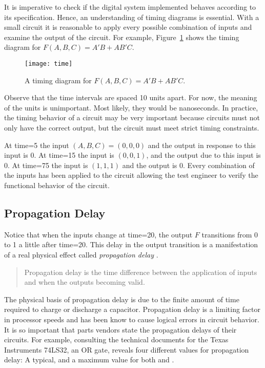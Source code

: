 It is imperative to check if the digital system implemented
behaves according to its specification. Hence, an understanding of
timing diagrams is essential.  With a small circuit it is reasonable
to apply every possible combination of inputs and examine the 
output of the circuit.  For example, Figure~\ref{fig:represenationsTime} shows
the timing diagram for $F(A,B,C) = A'B+AB'C$.

\begin{figure}[ht]
\texttt{[image: time]}
\caption{A timing diagram for $F(A,B,C) = A'B + AB'C$.}
\label{fig:represenationsTime}
\end{figure}

Observe that the time intervals are spaced 10 units apart.  For
now, the meaning of the units is unimportant.  Most likely, they would
be nanoseconds.  In practice, the timing behavior of a circuit
may be very important because circuits must not only have the 
correct output, but the circuit must meet strict timing constraints.

At time=5 the input $(A,B,C)=(0,0,0)$ and the output in response
to this input is 0.  At time=15 the input is $(0,0,1)$, and the
output due to this input is 0.  At time=75 the input is $(1,1,1)$
and the output is 0.  Every combination of the inputs has been 
applied to the circuit allowing the test engineer to verify the 
functional behavior of the circuit.

\subsection{Propagation Delay}
Notice that when the inputs change at time=20, the output $F$ 
transitions from 0 to 1 a little after time=20. This delay in the 
output transition is a manifestation of a real physical effect 
called \textit{propagation delay} .  
\begin{quote}
Propagation delay is the time difference between the application of 
inputs and when the outputs becoming valid. 
\end{quote}
The physical basis of propagation delay is due to the finite amount 
of time required to charge or discharge a capacitor.  Propagation delay
is a limiting factor in processor speeds and has been know to cause
logical errors in circuit behavior.  It is so important that parts vendors
state the propagation delays of their circuits.  For example, 
consulting the technical documents for the Texas Instruments
74LS32, an OR gate, reveals four different values for propagation
delay: A typical, and a maximum value for both \Tphl and \Tplh.

